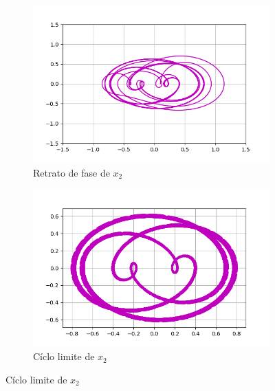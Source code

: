 \documentclass{article}
\begin{document}
\begin{figure}[ht!]
	\begin{subfigure}[b]{0.5\linewidth}
    \raggedleft
	\includegraphics[width=\linewidth]{ejercicio41-phase-x2.png}
    \caption{Retrato de fase de $x_2$}
	\end{subfigure}
	\begin{subfigure}[b]{0.5\linewidth}
    \raggedright
	\includegraphics[width=\linewidth]{ejercicio41-limit-x2.png}
	\caption{Cíclo limite de $x_2$}
    \end{subfigure}
\end{figure}
\end{document}
